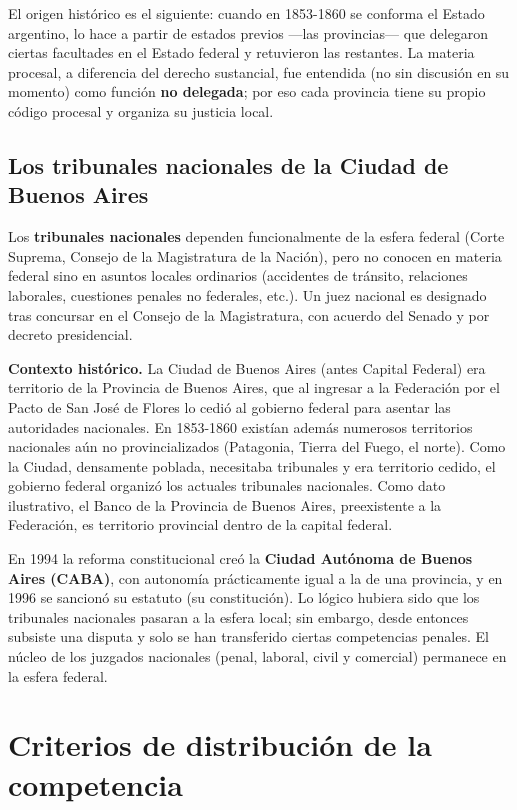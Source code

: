 \documentclass[12pt,oneside]{book}
\begin{document}
El origen histórico es el siguiente: cuando en 1853-1860 se conforma el Estado argentino, lo hace a partir de estados previos ---las provincias--- que delegaron ciertas facultades en el Estado federal y retuvieron las restantes. La materia procesal, a diferencia del derecho sustancial, fue entendida (no sin discusión en su momento) como función \textbf{no delegada}; por eso cada provincia tiene su propio código procesal y organiza su justicia local.

\subsection{Los tribunales nacionales de la Ciudad de Buenos Aires}

Los \textbf{tribunales nacionales} dependen funcionalmente de la esfera federal (Corte Suprema, Consejo de la Magistratura de la Nación), pero no conocen en materia federal sino en asuntos locales ordinarios (accidentes de tránsito, relaciones laborales, cuestiones penales no federales, etc.). Un juez nacional es designado tras concursar en el Consejo de la Magistratura, con acuerdo del Senado y por decreto presidencial.

\begin{nota}
\textbf{Contexto histórico.} La Ciudad de Buenos Aires (antes Capital Federal) era territorio de la Provincia de Buenos Aires, que al ingresar a la Federación por el Pacto de San José de Flores lo cedió al gobierno federal para asentar las autoridades nacionales. En 1853-1860 existían además numerosos territorios nacionales aún no provincializados (Patagonia, Tierra del Fuego, el norte). Como la Ciudad, densamente poblada, necesitaba tribunales y era territorio cedido, el gobierno federal organizó los actuales tribunales nacionales. Como dato ilustrativo, el Banco de la Provincia de Buenos Aires, preexistente a la Federación, es territorio provincial dentro de la capital federal.
\end{nota}

En 1994 la reforma constitucional creó la \textbf{Ciudad Autónoma de Buenos Aires (CABA)}, con autonomía prácticamente igual a la de una provincia, y en 1996 se sancionó su estatuto (su constitución). Lo lógico hubiera sido que los tribunales nacionales pasaran a la esfera local; sin embargo, desde entonces subsiste una disputa y solo se han transferido ciertas competencias penales. El núcleo de los juzgados nacionales (penal, laboral, civil y comercial) permanece en la esfera federal.

\section{Criterios de distribución de la competencia}
\end{document}
